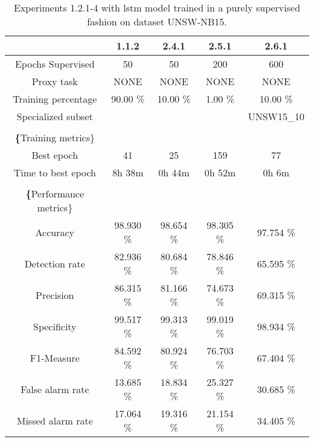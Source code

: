 \begin{table}[htb]
    \centering
    \begin{tabular}{@{}ccccc@{}}
        \toprule
         & 1.1.2 & 2.4.1 & 2.5.1 & 2.6.1 \\
        \midrule
        Epochs Supervised &  50 &  50 &  200 &  600 \\
        Proxy task &  NONE &  NONE &  NONE &  NONE \\
        Training percentage &  90.00 \% &  10.00 \% &  1.00 \% &  10.00 \% \\
        Specialized subset &   &   &   &  UNSW15\_10 \\
         \\
        \textbf\{Training metrics\} &  &  &  &  \\
        Best epoch &  41 &  25 &  159 &  77 \\
        Time to best epoch &  8h 38m &  0h 44m &  0h 52m &  0h 6m \\
         \\
        \textbf\{Performance metrics\} &  &  &  &  \\
        Accuracy &  98.930 \% &  98.654 \% &  98.305 \% &  97.754 \% \\
        Detection rate &  82.936 \% &  80.684 \% &  78.846 \% &  65.595 \% \\
        Precision &  86.315 \% &  81.166 \% &  74.673 \% &  69.315 \% \\
        Specificity &  99.517 \% &  99.313 \% &  99.019 \% &  98.934 \% \\
        F1-Measure &  84.592 \% &  80.924 \% &  76.703 \% &  67.404 \% \\
        False alarm rate &  13.685 \% &  18.834 \% &  25.327 \% &  30.685 \% \\
        Missed alarm rate &  17.064 \% &  19.316 \% &  21.154 \% &  34.405 \% \\
        \bottomrule
    \end{tabular}
    \caption{Experiments 1.2.1-4 with \gls{lstm} model trained in a purely supervised fashion on dataset UNSW-NB15.}
    \label{table:results:lstm:stats_flows15_supervised}
\end{table}